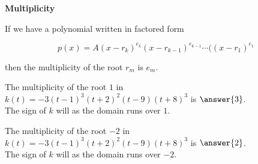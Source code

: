 \documentclass{ximera}
\author{Lee Wayand}
\begin{document}
\begin{exercise}






\begin{idea} \textbf{\textcolor{blue!55!black}{Multiplicity}}


If we have a polynomial written in factored form

\[
p(x) = A (x-r_k)^{e_k} (x-r_{k-1})^{e_{k-1}}  \cdots ((x-r_1)^{e_1}
\]

then the multiplicity of the root $r_m$ is $e_m$. \\





\end{idea}









\begin{question}



The multiplicity of the root $1$ in $k(t) = -3(t - 1)^3 (t + 2)^2 (t - 9) (t + 8)^3$ is $\answer{3}$. \\



The sign of $k$ will  as the domain runs over $1$.


\end{question}











\begin{question}



The multiplicity of the root $-2$ in $k(t) = -3(t - 1)^3 (t + 2)^2 (t - 9) (t + 8)^3$ is $\answer{2}$. \\



The sign of $k$ will  as the domain runs over $-2$.


\end{question}












\end{exercise}
\end{document}
